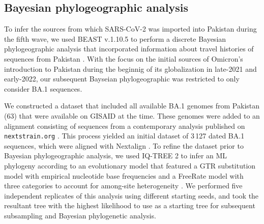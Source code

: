 \subsection{Bayesian phylogeographic analysis}\label{2:mm-beast}
To infer the sources from which SARS-CoV-2 was imported into Pakistan during the fifth wave, we used BEAST v.1.10.5 \citep{suchard2018bayesian} to perform a discrete Bayesian phylogeographic analysis \citep{lemey2009bayesian} that incorporated information about travel histories of sequences from Pakistan \citep{lemey2020accommodating}.
With the focus on the initial sources of Omicron's introduction to Pakistan during the beginnig of its globalization in late-2021 and early-2022, our subsequent Bayseian phylogeographic was restricted to only consider BA.1 sequences.

We constructed a dataset that included all available BA.1 genomes from Pakistan (63) that were available on GISAID at the time.
These genomes were added to an alignment consisting of sequences from a contemporary analysis published on \verb|nextstrain.org| \citep{hadfield2018nextstrain}.
This process yielded an initial dataset of 3\,127 dated BA.1 sequences, which were aligned with Nextalign \citep{aksamentov2021nextclade}.
To refine the dataset prior to Bayesian phylogeographic analysis, we used IQ-TREE 2 \citep{minh2020iq} to infer an ML phylogeny according to an evolutionary model that featured a GTR substitution model with empirical nucleotide base frequencies and a FreeRate model with three categories to account for among-site heterogeneity \citep{yang1995space, soubrier2012influence}. We performed five independent replicates of this analysis using different starting seeds, and took the resultant tree with the highest likelihood to use as a starting tree for subsequent subsampling and Bayesian phylogenetic analysis.

